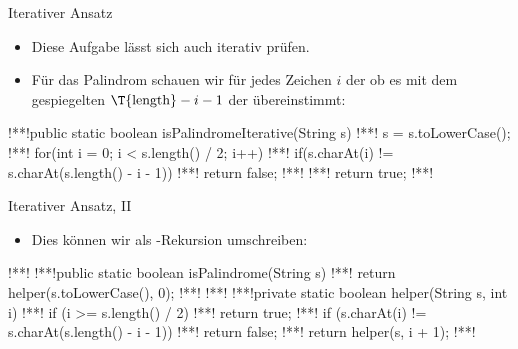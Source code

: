 \iffull
\begin{frame}[c,fragile]{Iterativer Ansatz}
    \begin{itemize}[<+(1)->]
        \item Diese Aufgabe lässt sich auch iterativ prüfen.
        \item Für das Palindrom schauen wir für jedes Zeichen \(i\) der  ob es mit dem gespiegelten \(\text{\T{length}} - i - 1\) der  übereinstimmt:
    \end{itemize}
\begin{plainjava}
!**!public static boolean isPalindromeIterative(String s) {
!**!    s = s.toLowerCase();
!**!    for(int i = 0; i < s.length() / 2; i++) {
!**!        if(s.charAt(i) != s.charAt(s.length() - i - 1))
!**!            return false;
!**!    }
!**!    return true;
!**!}
\end{plainjava}
\end{frame}

\begin{frame}[c,fragile]{Iterativer Ansatz, II}
    \begin{itemize}[<+(1)->]
        \item Dies können wir als -Rekursion umschreiben:
    \end{itemize}
\begin{plainjava}
!**!
!**!public static boolean isPalindrome(String s) {
!**!    return helper(s.toLowerCase(), 0);
!**!}
!**!
!**!private static boolean helper(String s, int i) {
!**!    if (i >= s.length() / 2)
!**!        return true;
!**!    if (s.charAt(i) != s.charAt(s.length() - i - 1))
!**!        return false;
!**!    return helper(s, i + 1);
!**!}
\end{plainjava}
\end{frame}
\fi

